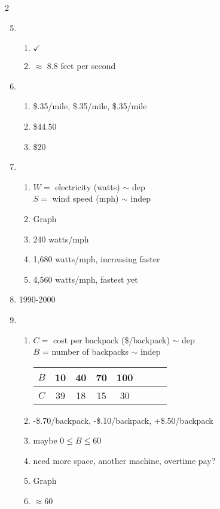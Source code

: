\begin{multicols} {2}
\begin{enumerate}
\setcounter{enumi}{4}

\item %
\begin{enumerate}
\item $\checkmark$
\item $\approx$ 8.8 feet per second
\end{enumerate}

\item %
\begin{enumerate}
\item \$.35/mile,  \$.35/mile,  \$.35/mile
\item \$44.50
\item \$20
\end{enumerate}

\item %
\begin{enumerate}
\item $W =$ electricity (watts) $\sim$ dep \\ $S=$ wind speed (mph) $\sim$ indep 
\item Graph
\item 240 watts/mph
\item 1,680 watts/mph, increasing faster
\item  4,560 watts/mph, fastest yet
\end{enumerate}

\item %
1990-2000

\item %
\begin{enumerate}
\item $C=$ cost per backpack (\$/backpack) $\sim$ dep \\ $B$ = number of backpacks $\sim$ indep \\
\begin{tabular} {|c| |c|c |c|c |c|c |c|}\hline
$B$ & 10 & 40 & 70 & 100\\ \hline
$C$ & 39 & 18 & 15 & 30  \\ \hline
\end{tabular}
\item -\$.70/backpack, -\$.10/backpack, +\$.50/backpack
\item maybe $0 \le B \le 60$
\item need more space, another machine, overtime pay?
\item Graph
\item $\approx 60$ 


\end{enumerate}
\end{enumerate}
\end{multicols}
